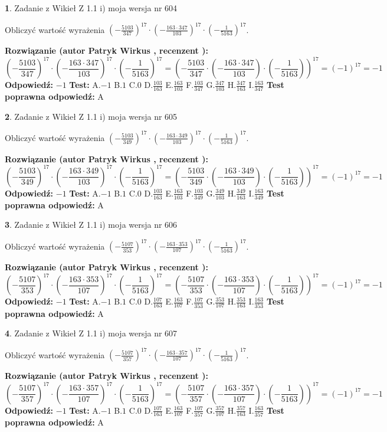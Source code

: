 \documentclass[12pt, a4paper]{article}
\theoremstyle{definition} %
\newtheorem{zad}{}
\newcommand{\zadStart}[1]{\begin{zad}#1\newline}
\newcommand{\zadStop}{\end{zad}}
\newcommand{\rozwStart}[2]{\noindent \textbf{Rozwiązanie (autor #1 , recenzent #2): }\newline}
\newcommand{\rozwStop}{\newline}
\newcommand{\odpStart}{\noindent \textbf{Odpowiedź:}\newline}
\newcommand{\odpStop}{\newline}
\newcommand{\testStart}{\noindent \textbf{Test:}\newline}
\newcommand{\testStop}{\newline}
\newcommand{\kluczStart}{\noindent \textbf{Test poprawna odpowiedź:}\newline}
\newcommand{\kluczStop}{\newline}
\begin{document}
\zadStart{Zadanie z Wikieł Z 1.1 i) moja wersja nr 604}

Obliczyć wartość wyrażenia $(-\frac{5103}{347})^{17} \cdot (-\frac{163 \cdot 347}{103})^{17} \cdot (-\frac{1}{5163})^{17}$.
\zadStop
\rozwStart{Patryk Wirkus}{}
$$(-\frac{5103}{347})^{17} \cdot (-\frac{163 \cdot 347}{103})^{17} \cdot (-\frac{1}{5163})^{17} = (-\frac{5103}{347} \cdot (-\frac{163 \cdot 347}{103}) \cdot (-\frac{1}{5163}))^{17} = (-1)^{17} = -1$$
\rozwStop
\odpStart
$-1$
\odpStop
\testStart
A.$-1$ B.$1$ C.$0$ D.$\frac{103}{163}$ E.$\frac{163}{103}$
F.$\frac{103}{347}$ G.$\frac{347}{103}$
H.$\frac{347}{163}$
I.$\frac{163}{347}$
\testStop
\kluczStart
A
\kluczStop



\zadStart{Zadanie z Wikieł Z 1.1 i) moja wersja nr 605}

Obliczyć wartość wyrażenia $(-\frac{5103}{349})^{17} \cdot (-\frac{163 \cdot 349}{103})^{17} \cdot (-\frac{1}{5163})^{17}$.
\zadStop
\rozwStart{Patryk Wirkus}{}
$$(-\frac{5103}{349})^{17} \cdot (-\frac{163 \cdot 349}{103})^{17} \cdot (-\frac{1}{5163})^{17} = (-\frac{5103}{349} \cdot (-\frac{163 \cdot 349}{103}) \cdot (-\frac{1}{5163}))^{17} = (-1)^{17} = -1$$
\rozwStop
\odpStart
$-1$
\odpStop
\testStart
A.$-1$ B.$1$ C.$0$ D.$\frac{103}{163}$ E.$\frac{163}{103}$
F.$\frac{103}{349}$ G.$\frac{349}{103}$
H.$\frac{349}{163}$
I.$\frac{163}{349}$
\testStop
\kluczStart
A
\kluczStop



\zadStart{Zadanie z Wikieł Z 1.1 i) moja wersja nr 606}

Obliczyć wartość wyrażenia $(-\frac{5107}{353})^{17} \cdot (-\frac{163 \cdot 353}{107})^{17} \cdot (-\frac{1}{5163})^{17}$.
\zadStop
\rozwStart{Patryk Wirkus}{}
$$(-\frac{5107}{353})^{17} \cdot (-\frac{163 \cdot 353}{107})^{17} \cdot (-\frac{1}{5163})^{17} = (-\frac{5107}{353} \cdot (-\frac{163 \cdot 353}{107}) \cdot (-\frac{1}{5163}))^{17} = (-1)^{17} = -1$$
\rozwStop
\odpStart
$-1$
\odpStop
\testStart
A.$-1$ B.$1$ C.$0$ D.$\frac{107}{163}$ E.$\frac{163}{107}$
F.$\frac{107}{353}$ G.$\frac{353}{107}$
H.$\frac{353}{163}$
I.$\frac{163}{353}$
\testStop
\kluczStart
A
\kluczStop



\zadStart{Zadanie z Wikieł Z 1.1 i) moja wersja nr 607}

Obliczyć wartość wyrażenia $(-\frac{5107}{357})^{17} \cdot (-\frac{163 \cdot 357}{107})^{17} \cdot (-\frac{1}{5163})^{17}$.
\zadStop
\rozwStart{Patryk Wirkus}{}
$$(-\frac{5107}{357})^{17} \cdot (-\frac{163 \cdot 357}{107})^{17} \cdot (-\frac{1}{5163})^{17} = (-\frac{5107}{357} \cdot (-\frac{163 \cdot 357}{107}) \cdot (-\frac{1}{5163}))^{17} = (-1)^{17} = -1$$
\rozwStop
\odpStart
$-1$
\odpStop
\testStart
A.$-1$ B.$1$ C.$0$ D.$\frac{107}{163}$ E.$\frac{163}{107}$
F.$\frac{107}{357}$ G.$\frac{357}{107}$
H.$\frac{357}{163}$
I.$\frac{163}{357}$
\testStop
\kluczStart
A
\kluczStop
\end{document}
